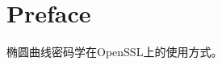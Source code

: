 \documentclass[../Main.tex]{subfiles}
\begin{document}
\chapter*{Preface}

椭圆曲线密码学在OpenSSL上的使用方式。
\end{document}
